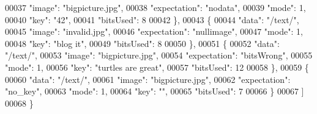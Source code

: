 \begin{DoxyCode}
00037             \textcolor{stringliteral}{"image"}: \textcolor{stringliteral}{"bigpicture.jpg"},
00038             \textcolor{stringliteral}{"expectation"}: \textcolor{stringliteral}{"nodata"},
00039             \textcolor{stringliteral}{"mode"}: 1,
00040             \textcolor{stringliteral}{"key"}: \textcolor{stringliteral}{"42"},
00041             \textcolor{stringliteral}{"bitsUsed"}: 8
00042         \},
00043         \{
00044             \textcolor{stringliteral}{"data"}: \textcolor{stringliteral}{"/text/"},
00045             \textcolor{stringliteral}{"image"}: \textcolor{stringliteral}{"invalid.jpg"},
00046             \textcolor{stringliteral}{"expectation"}: \textcolor{stringliteral}{"nullimage"},
00047             \textcolor{stringliteral}{"mode"}: 1,
00048             \textcolor{stringliteral}{"key"}: \textcolor{stringliteral}{"blog it"},
00049             \textcolor{stringliteral}{"bitsUsed"}: 8
00050         \},
00051         \{
00052             \textcolor{stringliteral}{"data"}: \textcolor{stringliteral}{"/text/"},
00053             \textcolor{stringliteral}{"image"}: \textcolor{stringliteral}{"bigpicture.jpg"},
00054             \textcolor{stringliteral}{"expectation"}: \textcolor{stringliteral}{"bitsWrong"},
00055             \textcolor{stringliteral}{"mode"}: 1,
00056             \textcolor{stringliteral}{"key"}: \textcolor{stringliteral}{"turtles are great"},
00057             \textcolor{stringliteral}{"bitsUsed"}: 12
00058         \},
00059         \{
00060             \textcolor{stringliteral}{"data"}: \textcolor{stringliteral}{"/text/"},
00061             \textcolor{stringliteral}{"image"}: \textcolor{stringliteral}{"bigpicture.jpg"},
00062             \textcolor{stringliteral}{"expectation"}: \textcolor{stringliteral}{"no\_key"},
00063             \textcolor{stringliteral}{"mode"}: 1,
00064             \textcolor{stringliteral}{"key"}: \textcolor{stringliteral}{""},
00065             \textcolor{stringliteral}{"bitsUsed"}: 7
00066         \}
00067     ]
00068 \}
\end{DoxyCode}
